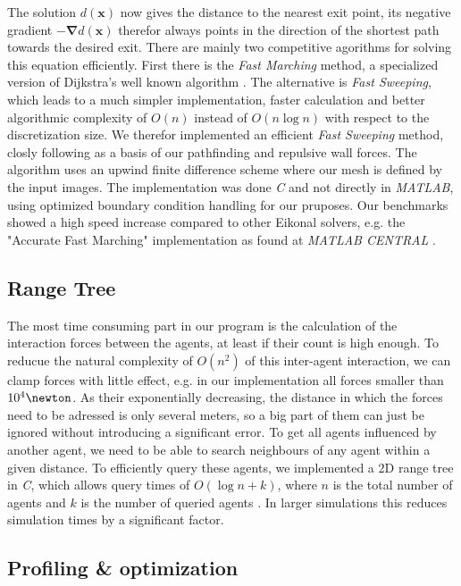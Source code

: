 \documentclass[11pt]{article}
\begin{document}
The solution $d(\mathbf{x})$ now gives the distance to the nearest exit point, its negative gradient $-\mathbf{\nabla}d(\mathbf{x})$ therefor always points in the direction of the shortest path towards the desired exit. There are mainly two competitive agorithms for solving this equation efficiently. First there is the \textit{Fast Marching} method, a specialized version of Dijkstra's well known algorithm \cite{dijkstra59a}. The alternative is \textit{Fast Sweeping}, which leads to a much simpler implementation, faster calculation and better algorithmic complexity of $O(n)$ instead of $O(n\log n)$ with respect to the discretization size. We therefor implemented an efficient \textit{Fast Sweeping} method, closly following \cite{Zhao04afast} as a basis of our pathfinding and repulsive wall forces. The algorithm uses an upwind finite difference scheme where our mesh is defined by the input images. The implementation was done \textit{C} and not directly in \textit{MATLAB}, using optimized boundary condition handling for our pruposes. Our benchmarks showed a high speed increase compared to other Eikonal solvers, e.g. the "Accurate Fast Marching" implementation as found at \textit{MATLAB CENTRAL} \cite{fastmarching}.

\subsection{Range Tree}
The most time consuming part in our program is the calculation of the interaction forces between the agents, at least if their count is high enough. To reducue the natural complexity of $O(n^{2})$ of this inter-agent interaction, we can clamp forces with little effect, e.g. in our implementation all forces smaller than $ 10^{4}\newton$. As their exponentially decreasing, the distance in which the forces need to be adressed is only several meters, so a big part of them can just be ignored without introducing a significant error.
To get all agents influenced by another agent, we need to be able to search neighbours of any agent within a given distance. To efficiently query these agents, we implemented a 2D range tree in \textit{C}, which allows query times of $O(\log n+k)$, where $n$ is the total number of agents and $k$ is the number of queried agents \cite{algdat}. In larger simulations this reduces simulation times by a significant factor.


\subsection{Profiling \& optimization}
\end{document}

